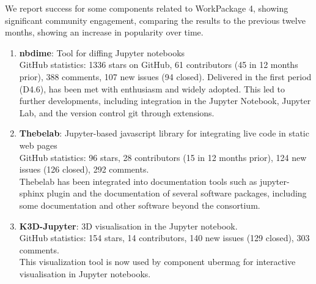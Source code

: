 We report success for some \ODK components related to WorkPackage 4,
showing significant community engagement,
comparing the results to the previous twelve months,
showing an increase in popularity over time.

\begin{enumerate}
\item \textbf{nbdime}: Tool for diffing Jupyter notebooks\\
  GitHub statistics: 1336 stars on GitHub, 61 contributors (45 in 12
  months prior), 388 comments, 107 new issues (94 closed). Delivered
  in the first period (D4.6),  has been met with
  enthusiasm and widely adopted. This led to further developments,
  including integration in the Jupyter Notebook,
  Jupyter Lab, and the version control git through extensions.
\item \textbf{Thebelab}: Jupyter-based javascript library for integrating live code in static web pages\\
  GitHub statistics: 96 stars, 28 contributors (15 in 12 months prior), 124 new issues (126 closed), 292 comments.\\
  Thebelab has been integrated into documentation tools such as jupyter-sphinx plugin
  and the documentation of several software packages,
  including some \SageMath documentation and other software beyond the \ODK consortium.
\item \textbf{K3D-Jupyter}: 3D visualisation in the Jupyter notebook.\\
  GitHub statistics: 154 stars, 14 contributors, 140 new issues (129 closed), 303 comments. \\
  This visualization tool is now used by \ODK component ubermag
  for interactive visualisation in Jupyter notebooks.
\end{enumerate}


